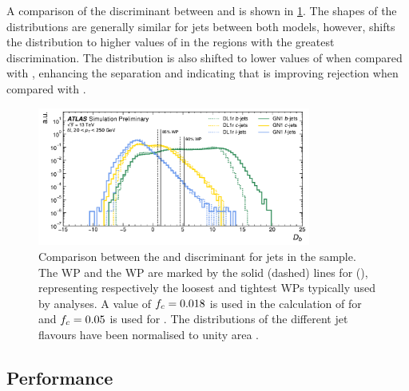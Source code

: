 A comparison of the \btag discriminant \Db between \DLr and \GNN is shown in \cref{fig:ttbar_btag_disc}. 
The shapes of the \Db distributions are generally similar for \bcl jets between both models, however, \GNN shifts the \bjet distribution to higher values of \Db in the regions with the greatest discrimination.
The \GNN \cjet distribution is also shifted to lower values of \Db when compared with \DLr, enhancing the separation and indicating that \GNN is improving \cjet rejection when compared with \DLr.

\begin{figure}[!htb]
    \centering
    \includegraphics[width=0.8\textwidth]{chapters/gnn_tagger/figs/results/main/ttbar/ttbar_score_DL1r_GN120220509_btag.pdf}
    \caption{Comparison between the \DLr and \GNN \btag discriminant \Db for jets in the \ttbar sample.
    The  WP and the  WP are marked by the solid (dashed) lines for \GNN (\DLr), representing respectively the loosest and tightest WPs typically used by analyses.
    A value of $f_c = 0.018$ is used in the calculation of \Db for \DLr and $f_c = 0.05$ is used for \GNN. The distributions of the different jet flavours have been normalised to unity area \cite{ATL-PHYS-PUB-2022-027}.}
    \label{fig:ttbar_btag_disc}
\end{figure}



\subsection{\texorpdfstring{\btagging}{b-tagging} Performance}\label{sec:gnn_btag_perf}

